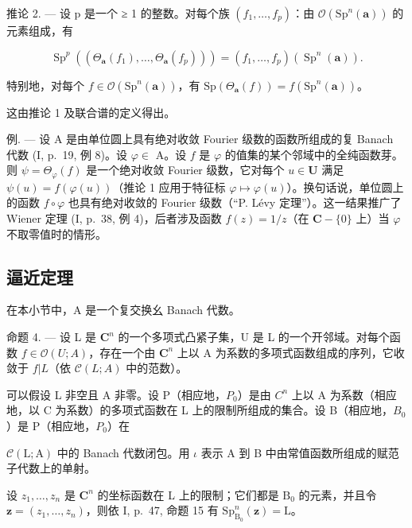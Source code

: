 推论 2. --- 设 p 是一个 ≥ 1 的整数。对每个族 \((f_{1},\ldots,f_{p})\)：由 \(\mathcal{O}(\mathrm{Sp}^{n}(\boldsymbol{a}))\) 的元素组成，有

\[
\operatorname{Sp} ^ {p} \left(\left(\Theta_ {\boldsymbol {a}} \left(f _ {1}\right), \dots , \Theta_ {\boldsymbol {a}} \left(f _ {p}\right)\right)\right) = \left(f _ {1}, \dots , f _ {p}\right) \left(\operatorname{Sp} ^ {n} (\boldsymbol {a})\right).
\]

特别地，对每个 \(f \in \mathcal{O}(\mathrm{Sp}^n(\boldsymbol{a}))\)，有 \(\mathrm{Sp}(\Theta_{\boldsymbol{a}}(f)) = f(\mathrm{Sp}^n(\boldsymbol{a}))\)。

这由推论 1 及联合谱的定义得出。

例. --- 设 A 是由单位圆上具有绝对收敛 Fourier 级数的函数所组成的复 Banach 代数 (I, p.~19, 例 8)。设 \(\varphi \in\) A。设 \(f\) 是 \(\varphi\) 的值集的某个邻域中的全纯函数芽。则 \(\psi = \Theta_{\varphi}(f)\) 是一个绝对收敛 Fourier 级数，它对每个 \(u \in \mathbf{U}\) 满足 \(\psi(u) = f(\varphi(u))\)（推论 1 应用于特征标 \(\varphi \mapsto \varphi(u)\)）。换句话说，单位圆上的函数 \(f \circ \varphi\) 也具有绝对收敛的 Fourier 级数（“P. Lévy 定理”）。这一结果推广了 Wiener 定理 (I, p.~38, 例 4)，后者涉及函数 \(f(z) = 1/z\)（在 \(\mathbf{C} - \{0\}\) 上）当 \(\varphi\) 不取零值时的情形。

\subsection{逼近定理}

在本小节中，A 是一个复交换幺 Banach 代数。

命题 4. --- 设 L 是 \(\mathbf{C}^{n}\) 的一个多项式凸紧子集，U 是 L 的一个开邻域。对每个函数 \(f\in\mathcal{O}(U;A)\)，存在一个由 \(\mathbf{C}^{n}\) 上以 A 为系数的多项式函数组成的序列，它收敛于 \(f|L\)（依 \(\mathcal{C}(L;A)\) 中的范数）。

可以假设 L 非空且 A 非零。设 P（相应地，\(P_{0}\)）是由 \(C^{n}\) 上以 A 为系数（相应地，以 C 为系数）的多项式函数在 L 上的限制所组成的集合。设 B（相应地，\(B_{0}\)）是 P（相应地，\(P_{0}\)）在

\(\mathcal{C}(\mathrm{L};\mathrm{A})\) 中的 Banach 代数闭包。用 \(\iota\) 表示 A 到 B 中由常值函数所组成的赋范子代数上的单射。

设 \(z_{1},\ldots,z_{n}\) 是 \(\mathbf{C}^{n}\) 的坐标函数在 L 上的限制；它们都是 \(\mathrm{B}_{0}\) 的元素，并且令 \(\boldsymbol{z}=(z_{1},\ldots,z_{n})\)，则依 I, p.~47, 命题 15 有 \(\mathrm{Sp}_{\mathrm{B}_{0}}^{n}(\boldsymbol{z})=\mathrm{L}\)。

